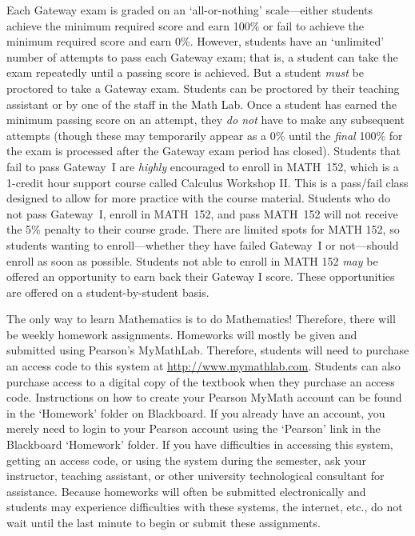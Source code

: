 \documentclass[11pt,letterpaper]{article}
\begin{document}
Each Gateway exam is graded on an `all-or-nothing' scale---either students achieve the minimum required score and earn 100\% or fail to achieve the minimum required score and earn 0\%. However, students have an `unlimited' number of attempts to pass each Gateway exam; that is, a student can take the exam repeatedly until a passing score is achieved. But a student \textit{must} be proctored to take a Gateway exam. Students can be proctored by their teaching assistant or by one of the staff in the Math Lab. Once a student has earned the minimum passing score on an attempt, they \textit{do not} have to make any subsequent attempts (though these may temporarily appear as a 0\% until the \textit{final} 100\% for the exam is processed after the Gateway exam period has closed). Students that fail to pass Gateway~I are \textit{highly} encouraged to enroll in MATH~152, which is a 1-credit hour support course called Calculus Workshop II. This is a pass/fail class designed to allow for more practice with the course material. Students who do not pass Gateway~I, enroll in MATH~152, and pass MATH~152 will not receive the 5\% penalty to their course grade. There are limited spots for MATH 152, so students wanting to enroll---whether they have failed Gateway~I or not---should enroll as soon as possible. Students not able to enroll in MATH 152 \textit{may} be offered an opportunity to earn back their Gateway I score. These opportunities are offered on a student-by-student basis.
\pspace




The only way to learn Mathematics is to do Mathematics! Therefore, there will be weekly homework assignments. Homeworks will mostly be given and submitted using Pearson's MyMathLab. Therefore, students will need to purchase an access code to this system at \url{http://www.mymathlab.com}. Students can also purchase access to a digital copy of the textbook when they purchase an access code. Instructions on how to create your Pearson MyMath account can be found in the `Homework' folder on Blackboard. If you already have an account, you merely need to login to your Pearson account using the `Pearson' link in the Blackboard `Homework' folder. If you have difficulties in accessing this system, getting an access code, or using the system during the semester, ask your instructor, teaching assistant, or other university technological consultant for assistance. Because homeworks will often be submitted electronically and students may experience difficulties with these systems, the internet, etc., do not wait until the last minute to begin or submit these assignments. \pspace
\end{document}

